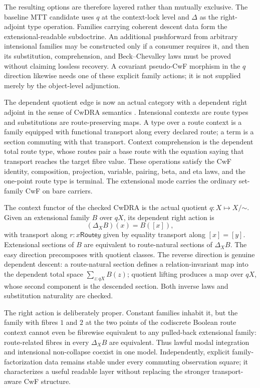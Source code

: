 \documentclass[11pt]{article}
\theoremstyle{definition}
\theoremstyle{remark}
\begin{document}
The resulting options are therefore layered rather than mutually exclusive.
The baseline MTT candidate uses $q$ at the context-lock level and $\Delta$ as
the right-adjoint type operation.  Families carrying coherent descent data
form the extensional-readable subdoctrine.  An additional pushforward from
arbitrary intensional families may be constructed only if a consumer requires
it, and then its substitution, comprehension, and Beck--Chevalley laws must be
proved without claiming lossless recovery.  A covariant pseudo-CwF morphism in
the $q$ direction likewise needs one of these explicit family actions; it is
not supplied merely by the object-level adjunction.

The dependent quotient edge is now an actual category with a dependent right
adjoint in the sense of CwDRA semantics
\cite{BirkedalCloustonMannaaMogelbergPittsSpittersDRA}.  Intensional contexts
are route types and substitutions are route-preserving maps.  A type over a
route context is a family equipped with functional transport along every
declared route; a term is a section commuting with that transport.  Context
comprehension is the dependent total route type, whose routes pair a base
route with the equation saying that transport reaches the target fibre value.
These operations satisfy the CwF identity, composition, projection, variable,
pairing, beta, and eta laws, and the one-point route type is terminal.  The
extensional mode carries the ordinary set-family CwF on bare carriers.

The context functor of the checked CwDRA is the actual quotient
$q:X\mapsto X/{\mathord\sim}$.  Given an extensional family $B$ over $qX$, its
dependent right action is
\[
  (\Delta_X B)(x)=B([x]),
\]
with transport along $r:x\mathrel{\mathsf{Route}}y$ given by equality transport
along $[x]=[y]$.  Extensional sections of $B$ are equivalent to route-natural
sections of $\Delta_XB$.  The easy direction precomposes with quotient classes.
The reverse direction is genuine dependent descent: a route-natural section
defines a relation-invariant map into the dependent total space
$\sum_{z:qX}B(z)$; quotient lifting produces a map over $qX$, whose second
component is the descended section.  Both inverse laws and substitution
naturality are checked.

The right action is deliberately proper.  Constant families inhabit it, but
the family with fibres $1$ and $2$ at the two points of the codiscrete Boolean
route context cannot even be fibrewise equivalent to any pulled-back
extensional family: route-related fibres in every $\Delta_XB$ are equivalent.
Thus lawful modal integration and intensional non-collapse coexist in one
model.  Independently, explicit family-factorization data remains stable under
every commuting observation square; it characterizes a useful readable layer
without replacing the stronger transport-aware CwF structure.
\end{document}
